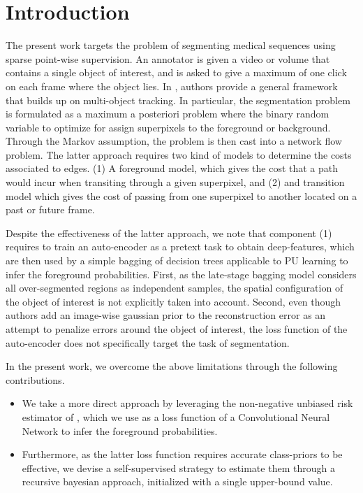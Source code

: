\section{Introduction}
\label{sec:intro}
The present work targets the problem of segmenting medical sequences using sparse point-wise supervision.
An annotator is given a video or volume that contains a single object of interest, and is asked to give a maximum of one click on each frame where the object lies.
In \cite{lejeune18}, authors provide a general framework that builds up on multi-object tracking.
In particular, the segmentation problem is formulated as a maximum a posteriori problem where the binary random variable to optimize for assign superpixels to the foreground or background.
Through the Markov assumption, the problem is then cast into a network flow problem.
The latter approach requires two kind of models to determine the costs associated to edges.
(1) A foreground model, which gives the cost that a path would incur when transiting through a given superpixel, and (2) and transition model which gives the cost of passing from one superpixel to another located on a past or future frame.

Despite the effectiveness of the latter approach, we note that component (1) requires to train an auto-encoder as a pretext task to obtain deep-features, which are then used by a simple bagging of decision trees applicable to PU learning to infer the foreground probabilities.
First, as the late-stage bagging model considers all over-segmented regions as independent samples,
the spatial configuration of the object of interest is not explicitly taken into account.
Second, even though authors add an image-wise gaussian prior to the reconstruction error as an attempt to penalize errors around the object of interest,
the loss function of the auto-encoder does not specifically target the task of segmentation.

In the present work, we overcome the above limitations through the following contributions.
\begin{itemize}
    \item We take a more direct approach by leveraging the non-negative unbiased risk estimator of \cite{kiryo17}, which we use as a loss function of a Convolutional Neural Network to infer the foreground probabilities.
  \item Furthermore, as the latter loss function requires accurate class-priors to be effective,
    we devise a self-supervised strategy to estimate them through a recursive bayesian approach, initialized with a single upper-bound value.
\end{itemize}

